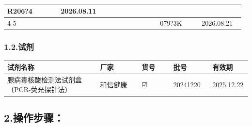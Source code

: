 \documentclass[UTF8,10pt,a4paper,fontset=fandol]{ctexart}
\newcommand{\fieldvalue}[1]{#1}
\newcommand{\handwritten}[1]{#1}
\newcommand{\checkboxfield}[1]{\ifstrequal{#1}{checked}{☑}{\ifstrequal{#1}{unclear}{?}{☐}}}
\begin{document}
\begin{tabular}{|p{0.23\linewidth}|p{0.13\linewidth}|p{0.25\linewidth}|p{0.18\linewidth}|p{0.18\linewidth}|}
\fieldvalue{\handwritten{R206?4}} &
\fieldvalue{\handwritten{2026.08.11}} \\ \cline{4-5}
&
&
&
\fieldvalue{\handwritten{079?3K}} &
\fieldvalue{\handwritten{2026.08.21}} \\ \hline
\end{tabular}

\subsubsection*{1.2.\quad 试剂}

\noindent
\begin{tabular}{|p{0.38\linewidth}|p{0.17\linewidth}|p{0.13\linewidth}|p{0.16\linewidth}|p{0.16\linewidth}|}
\hline
试剂名称 & 厂家 & 货号 & 批号 & 有效期 \\ \hline
腺病毒核酸检测法试剂盒（PCR-荧光探针法） &
和信健康 &
\fieldvalue{\handwritten{\checkboxfield{checked}}} &
\fieldvalue{\handwritten{20241220}} &
\fieldvalue{\handwritten{2025.12.22}} \\ \hline
\end{tabular}

\subsection*{2.\quad 操作步骤：}
\end{document}
